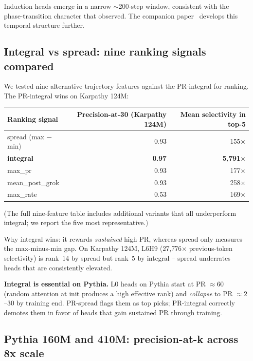 \documentclass[11pt]{article}
\begin{document}
Induction heads emerge in a narrow $\sim$200-step window, consistent with the phase-transition character that \citet{olsson2022induction} observed. The companion paper~\citep{paper2_developmental} develops this temporal structure further.

\subsection{Integral vs spread: nine ranking signals compared}
\label{sec:integral_vs_spread}

We tested nine alternative trajectory features against the PR-integral for ranking. The PR-integral wins on Karpathy 124M:

\begin{center}
\small
\begin{tabular}{lrr}
\toprule
Ranking signal & Precision-at-30 (Karpathy 124M) & Mean selectivity in top-5 \\
\midrule
spread (max $-$ min) & 0.93 & 155$\times$ \\
\textbf{integral} & \textbf{0.97} & \textbf{5{,}791}$\times$ \\
max\_pr & 0.93 & 177$\times$ \\
mean\_post\_grok & 0.93 & 258$\times$ \\
max\_rate & 0.53 & 169$\times$ \\
\bottomrule
\end{tabular}
\end{center}

(The full nine-feature table includes additional variants that all underperform integral; we report the five most representative.)

Why integral wins: it rewards \emph{sustained} high PR, whereas spread only measures the max-minus-min gap. On Karpathy 124M, L6H9 (27{,}776$\times$ previous-token selectivity) is rank~14 by spread but rank~5 by integral -- spread underrates heads that are consistently elevated.

\textbf{Integral is essential on Pythia.} L0 heads on Pythia start at PR $\approx 60$ (random attention at init produces a high effective rank) and \emph{collapse} to PR $\approx 2$--$30$ by training end. PR-spread flags them as top picks; PR-integral correctly demotes them in favor of heads that gain sustained PR through training.

\subsection{Pythia 160M and 410M: precision-at-k across 8x scale}
\label{sec:pythia_p_at_k}
\end{document}
